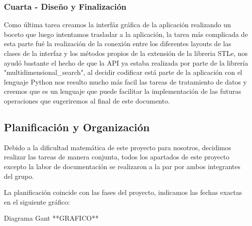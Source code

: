 \subsubsection{Cuarta - Diseño y Finalización}

	Como última tarea creamos la interfáz gráfica de la aplicación realizando un boceto que luego intentamos trasladar a la aplicación, la tarea más complicada de esta parte fué la realización de la conexión entre los diferentes layouts de las clases de la interfaz y los métodos propios de la extensión de la libreria STLe, nos ayudó bastante el hecho de que la API ya estaba realizada por parte de la librería "multidimensional\_search", al decidir codificar está parte de la aplicación con el lenguaje Python nos resulto mucho más facil las tareas de tratamiento de datos y creemos que es un lenguaje que puede facilitar la implementación de las futuras operaciones que sugeriremos al final de este documento. 


\subsection{Planificación y Organización}

Debido a la dificultad matemática de este proyecto para nosotros, decidimos realizar las tareas de manera conjunta, todos los apartados de este proyecto excepto la labor de documentación se realizaron a la par por ambos integrantes del grupo. 

La planificación coincide con las fases del proyecto, indicamos las fechas exactas en el siguiente gráfico: 

Diagrama Gant **GRAFICO**

